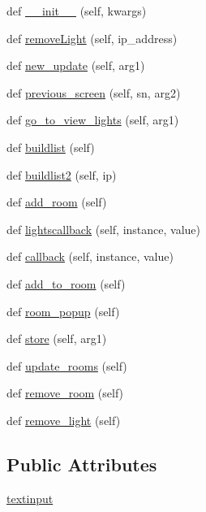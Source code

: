 \begin{DoxyCompactItemize}
\item 
def \hyperlink{classGUI8_1_1LightsView_aed889232610f472c1dbf01b8642f97b7}{\+\_\+\+\_\+init\+\_\+\+\_\+} (self, kwargs)
\item 
def \hyperlink{classGUI8_1_1LightsView_aaa45ed32c445502099c5f0c9671d4ca9}{remove\+Light} (self, ip\+\_\+address)
\item 
def \hyperlink{classGUI8_1_1LightsView_a81dd6f4c3010fde8b66a3354a0a58638}{new\+\_\+update} (self, arg1)
\item 
def \hyperlink{classGUI8_1_1LightsView_a447676485186bcb6b0c7974489d708c3}{previous\+\_\+screen} (self, sn, arg2)
\item 
def \hyperlink{classGUI8_1_1LightsView_a4bea440e8f1cb582bb6e5999a6c092bb}{go\+\_\+to\+\_\+view\+\_\+lights} (self, arg1)
\item 
def \hyperlink{classGUI8_1_1LightsView_ada6687e6cce446a0fb04aa126a82ca23}{buildlist} (self)
\item 
def \hyperlink{classGUI8_1_1LightsView_a452671b042632f92e9829044c76fa4c8}{buildlist2} (self, ip)
\item 
def \hyperlink{classGUI8_1_1LightsView_a17953ac1919296fe83ce363045162dfe}{add\+\_\+room} (self)
\item 
def \hyperlink{classGUI8_1_1LightsView_ada549a9f546170b2c5bbe46b61eea033}{lightscallback} (self, instance, value)
\item 
def \hyperlink{classGUI8_1_1LightsView_af234c10fa2c00f715363efc0de45e0c8}{callback} (self, instance, value)
\item 
def \hyperlink{classGUI8_1_1LightsView_adba201635dd08cc14cf993eea2841ae4}{add\+\_\+to\+\_\+room} (self)
\item 
def \hyperlink{classGUI8_1_1LightsView_a3d46689d8b2baa1e006587031c1a177f}{room\+\_\+popup} (self)
\item 
def \hyperlink{classGUI8_1_1LightsView_af6b2eb77701854746eb6617e826bab08}{store} (self, arg1)
\item 
def \hyperlink{classGUI8_1_1LightsView_a248a27eb4031eee351677ab45ea33fad}{update\+\_\+rooms} (self)
\item 
def \hyperlink{classGUI8_1_1LightsView_a8f9ea29dfd8bc7900aca7ec8ecfd6aac}{remove\+\_\+room} (self)
\item 
def \hyperlink{classGUI8_1_1LightsView_a7605161a7f104782ae1babc46e1abc23}{remove\+\_\+light} (self)
\end{DoxyCompactItemize}
\subsection*{Public Attributes}
\begin{DoxyCompactItemize}
\item 
\hyperlink{classGUI8_1_1LightsView_af42477d4f6dce0fdbef3142b50296a60}{textinput}
\end{DoxyCompactItemize}



